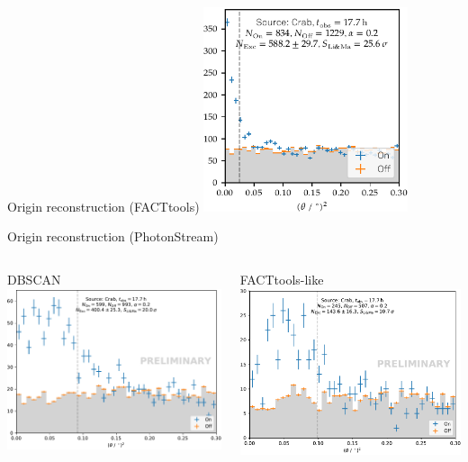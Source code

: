 \begin{frame}[t]{Origin reconstruction (FACTtools)}
    \centering
    \includegraphics[width=0.45\textwidth]{fig/theta2.pdf}
\end{frame}

\begin{frame}{Origin reconstruction (PhotonStream)}
  \begin{columns}[onlytextwidth]
    \begin{column}{0.475\textwidth}
        \centering
        \Large{DBSCAN}
        \includegraphics[width=\textwidth]{fig/theta2_plot_new.pdf}
    \end{column}
    \hfill%
    \begin{column}{0.475\textwidth}
        \centering
        \Large{FACTtools-like}
        \includegraphics[width=\textwidth]{fig/theta2_plot_thresh.pdf}

\end{column}
\end{columns}
\end{frame}
